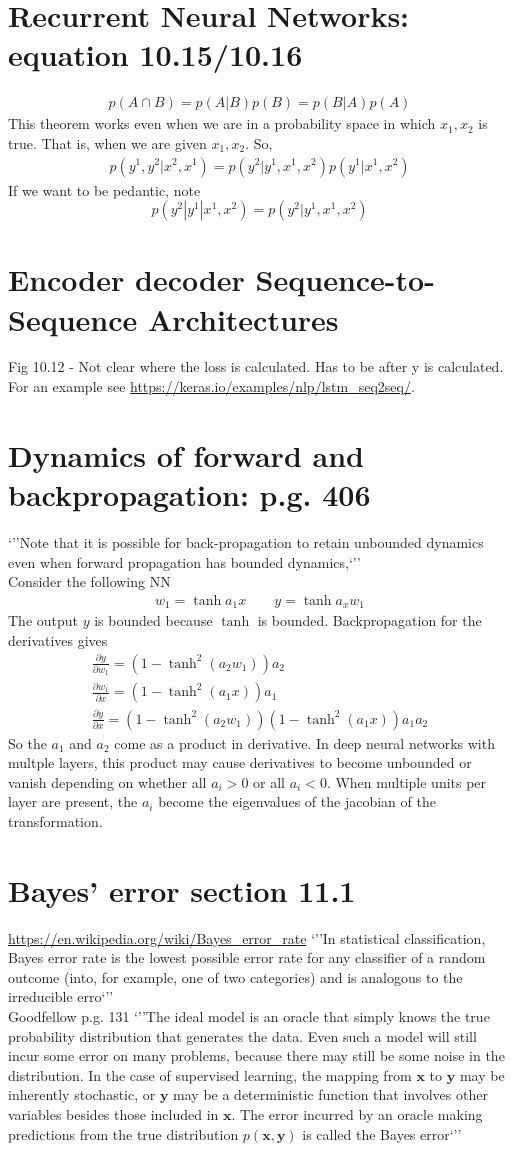 \documentclass{article}
\newcommand{\beq}{\begin{equation}}
\newcommand{\eeq}{\end{equation}}
\newcommand{\ber}{\begin{eqnarray}}
\newcommand{\eer}{\end{eqnarray}}
\newcommand{\pdd}[2]{\frac{\partial{#1}}{\partial{#2}}}
\begin{document}
\section{Recurrent Neural Networks: equation 10.15/10.16}
\ber
p(A\cap{B}) = p(A|B)p(B) = p(B|A)p(A)
\eer
This theorem works even when we are in a probability space in which $x_1,x_2$ is true. That is, when we are given $x_1,x_2$. So,
\ber
p(y^1,y^2|x^2,x^1) = p(y^2|y^1,x^1,x^2)p(y^1|x^1,x^2)
\eer
If we want to be pedantic, note
\beq
p(y^2|y^1|x^1,x^2) = p(y^2|y^1,x^1,x^2)
\eeq
%
%
%
\section{Encoder decoder Sequence-to-Sequence Architectures}
Fig 10.12 - Not clear where the loss is calculated. Has to be after y is calculated. For an example see \url{https://keras.io/examples/nlp/lstm_seq2seq/}.
%
%
%
\section{Dynamics of forward and backpropagation: p.g. 406}
`''Note that it is possible for back-propagation to retain unbounded dynamics even when forward propagation has bounded dynamics,`''\\
Consider the following NN
\ber
w_1 = \tanh{a_1x} \qquad y = \tanh{a_xw_1}
\eer
The output $y$ is bounded because $\tanh$ is bounded. Backpropagation for the derivatives gives
\ber
\pdd{y}{w_1} = (1-\tanh^2{(a_2w_1)})a_2\\
\pdd{w_1}{x} = (1-\tanh^2{(a_1x)})a_1\\
\pdd{y}{x} = (1-\tanh^2{(a_2w_1)})(1-\tanh^2{(a_1x)})a_1a_2
\eer
So the $a_1$ and $a_2$ come as a product in derivative. In deep neural networks with multple layers, this product may cause derivatives to become unbounded or vanish depending on whether all $a_i>0$ or all $a_i<0$. When multiple units per layer are present, the $a_i$ become the eigenvalues of the jacobian of the transformation. 
%
%
%
\section{Bayes' error section 11.1}
\url{https://en.wikipedia.org/wiki/Bayes_error_rate} `''In statistical classification, Bayes error rate is the lowest possible error rate for any classifier of a random outcome (into, for example, one of two categories) and is analogous to the irreducible erro`''\\
Goodfellow p.g. 131 `''The ideal model is an oracle that simply knows the true probability distribution
that generates the data. Even such a model will still incur some error on many
problems, because there may still be some noise in the distribution. In the case
of supervised learning, the mapping from $\pmb{x}$ to $\pmb{y}$ may be inherently stochastic,
or $\pmb{y}$ may be a deterministic function that involves other variables besides those
included in $\pmb{x}$. The error incurred by an oracle making predictions from the true
distribution $p(\pmb{x}, \pmb{y})$ is called the Bayes error`''
%
%
%
\end{document}
